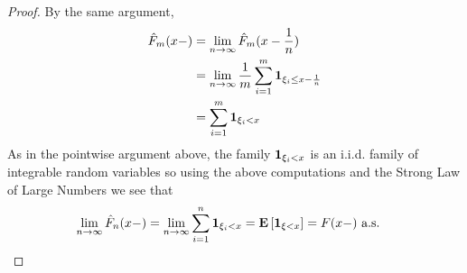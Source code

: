 \begin{proof}
By the same argument, 
\begin{align*}
\hat{F}_m(x-) &= \lim_{n \to \infty} \hat{F}_m (x - \frac{1}{n}) \\
&= \lim_{n \to \infty} \frac{1}{m} \sum_{i=1}^m \textbf{1}_{\xi_i
  \leq x - \frac{1}{n}}\\
&=\sum_{i=1}^m \textbf{1}_{\xi_i  < x}
\end{align*}
As in the pointwise argument above, the family $\textbf{1}_{\xi_i
  < x}$ is an i.i.d. family of integrable random variables so using
the above computations and the Strong Law of Large Numbers we see that
\begin{align*}
\lim_{n \to \infty} \hat{F}_n(x-) &= \lim_{n \to \infty} \sum_{i=1}^n
\textbf{1}_{\xi_i  < x} = \textbf{E}\left[\textbf{1}_{\xi  < x} \right]
= F(x-) \text{ a.s.}
\end{align*}
\end{proof}


